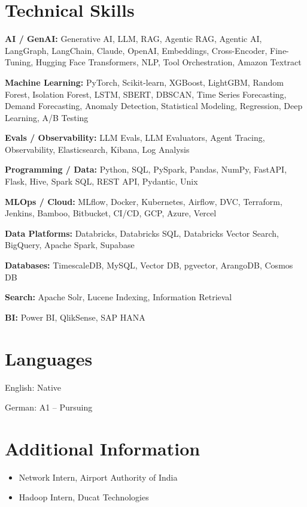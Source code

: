 \documentclass[10pt,a4paper]{article}
\begin{document}
\section{Technical Skills}
\textbf{AI / GenAI:} Generative AI, LLM, RAG, Agentic RAG, Agentic AI, LangGraph, LangChain, Claude, OpenAI, Embeddings, Cross-Encoder, Fine-Tuning, Hugging Face Transformers, NLP, Tool Orchestration, Amazon Textract\par
\textbf{Machine Learning:} PyTorch, Scikit-learn, XGBoost, LightGBM, Random Forest, Isolation Forest, LSTM, SBERT, DBSCAN, Time Series Forecasting, Demand Forecasting, Anomaly Detection, Statistical Modeling, Regression, Deep Learning, A/B Testing\par
\textbf{Evals / Observability:} LLM Evals, LLM Evaluators, Agent Tracing, Observability, Elasticsearch, Kibana, Log Analysis\par
\textbf{Programming / Data:} Python, SQL, PySpark, Pandas, NumPy, FastAPI, Flask, Hive, Spark SQL, REST API, Pydantic, Unix\par
\textbf{MLOps / Cloud:} MLflow, Docker, Kubernetes, Airflow, DVC, Terraform, Jenkins, Bamboo, Bitbucket, CI/CD, GCP, Azure, Vercel\par
\textbf{Data Platforms:} Databricks, Databricks SQL, Databricks Vector Search, BigQuery, Apache Spark, Supabase\par
\textbf{Databases:} TimescaleDB, MySQL, Vector DB, pgvector, ArangoDB, Cosmos DB\par
\textbf{Search:} Apache Solr, Lucene Indexing, Information Retrieval\par
\textbf{BI:} Power BI, QlikSense, SAP HANA\par

\section{Languages}
English: Native\par
German: A1 -- Pursuing\par

\section{Additional Information}
\begin{itemize}
  \item Network Intern, Airport Authority of India
  \item Hadoop Intern, Ducat Technologies
\end{itemize}
\end{document}
